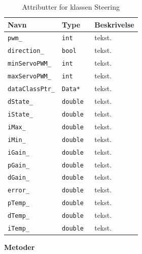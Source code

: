 \begin{table}[H]
\begin{tabularx}{\textwidth}{| Z | Z | L{10cm} |} \hline
Navn & Type & Beskrivelse \\\hline
\texttt{pwm\_} & \texttt{int} &tekst.\\\hline
\texttt{direction\_} & \texttt{bool} &tekst.\\\hline
\texttt{minServoPWM\_} & \texttt{int} &tekst.\\\hline
\texttt{maxServoPWM\_} & \texttt{int} &tekst.\\\hline
\texttt{dataClassPtr\_} & \texttt{Data*} &tekst.\\\hline
\texttt{dState\_} & \texttt{double } &tekst.\\\hline
\texttt{iState\_} & \texttt{double} &tekst.\\\hline
\texttt{iMax\_} & \texttt{double } &tekst.\\\hline
\texttt{iMin\_} & \texttt{double } &tekst.\\\hline
\texttt{iGain\_} & \texttt{double } &tekst.\\\hline
\texttt{pGain\_} & \texttt{double } &tekst.\\\hline
\texttt{dGain\_} & \texttt{double } &tekst.\\\hline
\texttt{error\_} & \texttt{double } &tekst.\\\hline
\texttt{pTemp\_} & \texttt{double } &tekst.\\\hline
\texttt{dTemp\_} & \texttt{double } &tekst.\\\hline
\texttt{iTemp\_} & \texttt{double } &tekst.\\\hline


\end{tabularx}
\caption{Attributter for klassen Steering}
\label{table:attr_steering}
\end{table}

\newpage
\textbf{Metoder} 



